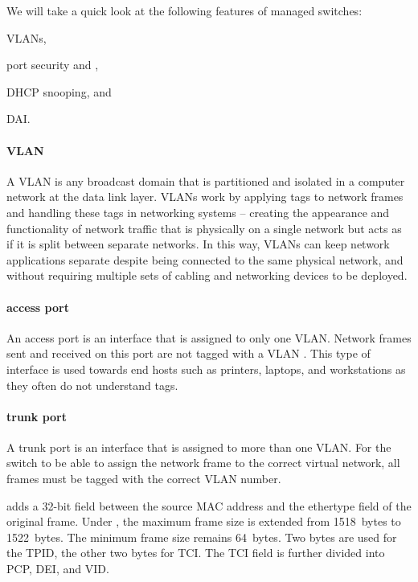 We will take a quick look at the following features of managed switches:
\begin{inlinelist}
\item \aclp{VLAN},
\item port security and ,
\item \acs{DHCP} snooping, and
\item \acl{DAI}.
\end{inlinelist}

\paragraph{\acs{VLAN}}
A \acf{VLAN} is any broadcast domain that is partitioned and isolated in a computer network at the data link layer.
\acp{VLAN} work by applying tags to network frames and handling these tags in networking systems -- creating the appearance and functionality of network traffic that is physically on a single network but acts as if it is split between separate networks.
In this way, \acp{VLAN} can keep network applications separate despite being connected to the same physical network, and without requiring multiple sets of cabling and networking devices to be deployed.


\paragraph{access port}
An access port is an interface that is assigned to only one \acs{VLAN}.
Network frames sent and received on this port are not tagged with a \acs{VLAN} .
This type of interface is used towards end hosts such as printers, laptops, and workstations as they often do not understand  tags.


\paragraph{trunk port}
A trunk port is an interface that is assigned to more than one \acs{VLAN}.
For the switch to be able to assign the network frame to the correct virtual network, all frames must be tagged with the correct \acs{VLAN} number.

 adds a 32-bit field between the source \acs{MAC} address and the ethertype field of the original frame.
Under , the maximum frame size is extended from 1518~bytes to 1522~bytes.
The minimum frame size remains 64~bytes.
Two bytes are used for the \acf{TPID}, the other two bytes for \acf{TCI}.
The \acs{TCI} field is further divided into \acs{PCP}, \acs{DEI}, and \acs{VID}.

